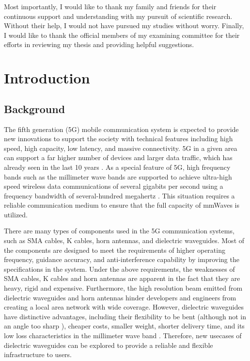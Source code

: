 \documentclass[a4paper,12pt]{report}
\begin{document}
Most importantly, I would like to thank my family and friends for their
continuous support and understanding with my pursuit of scientific research.
Without their help, I would not have pursued my studies without worry.
Finally, I would like to thank the official members of my examining
committee for their efforts in reviewing my thesis and providing helpful
suggestions.

\tableofcontents
\listoffigures
\listoftables

\cleardoublepage

\chapter{Introduction}

\setcounter{page}{1}
\renewcommand{\thepage}{\arabic{page}}

\section{Background}

The fifth generation (5G) mobile communication system
is expected to provide new innovations to support the society
with technical features including high speed, high
capacity, low latency, and massive connectivity.
5G in a given area can support a far higher number of devices
and larger data traffic,
which has already seen in the last 10 years \cite{pepper2013cisco}.
As a special feature of 5G,
high frequency bands such as the millimeter
wave bands are supported to achieve ultra-high speed
wireless data communications of several gigabits per second
using a frequency bandwidth of
several-hundred megahertz \cite{docomo_6G_white_paper}.
This situation requires a reliable communication medium to
ensure that the full capacity of mmWaves is utilized.

There are many types of components used in the 5G communication systems,
such as SMA cables, K cables, horn antennas, and dielectric waveguides.
Most of the components are designed to meet the
requirements of higher operating frequency, guidance accuracy, and anti-interference
capability by improving the specifications in the system.
Under the above requirements, the weaknesses of SMA cables, K cables and
horn antennas are apparent in the fact that they are heavy, rigid and expensive.
Furthermore, the high resolution beam emitted from dielectric waveguides
and horn antennas hinder developers and engineers from creating
a local area network with wide coverage.
However, dielectric waveguides have distinctive advantages,
including their flexibility to be bent (although not in an angle too sharp \cite{1017016}),
cheaper costs, smaller weight, shorter delivery time,
and its low loss characteristics in the millimeter wave band \cite{Suzuki2013MovingTU}.
Therefore,
new usecases of dielectric waveguides can be explored
to provide a reliable and flexible infrastructure to users.
\end{document}
